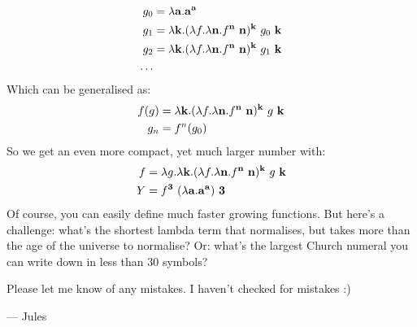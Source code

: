 \begin{align*}
  g_0 &= \lambda \ch{a}. \ch{a}^\ch{a}\\
  g_1 &= \lambda \ch{k}. (\lambda f. \lambda \ch{n}. f^\ch{n}\ \ch{n})^\ch{k}\ g_0\ \ch{k}\\
  g_2 &= \lambda \ch{k}. (\lambda f. \lambda \ch{n}. f^\ch{n}\ \ch{n})^\ch{k}\ g_1\ \ch{k}\\
  \dots
\end{align*}
Which can be generalised as:
\begin{align*}
  f(g) &= \lambda \ch{k}. (\lambda f. \lambda \ch{n}. f^\ch{n}\ \ch{n})^\ch{k}\ g\ \ch{k}\\
  g_n &= f^n(g_0)
\end{align*}
So we get an even more compact, yet much larger number with:
\begin{align*}
  f &= \lambda g. \lambda \mathbf{k}. (\lambda f. \lambda \mathbf{n}. f^{\mathbf{n}}\ \mathbf{n})^{\mathbf{k}}\ g\ \mathbf{k}\\
  Y &= f^{\mathbf{3}}\ (\lambda \mathbf{a}. \mathbf{a}^{\mathbf{a}})\ \mathbf{3}
\end{align*}
Of course, you can easily define much faster growing functions. But here's a challenge: what's the shortest lambda term that normalises, but takes more than the age of the universe to normalise? Or: what's the largest Church numeral you can write down in less than 30 symbols?

Please let me know of any mistakes. I haven't checked for mistakes :)

--- Jules

